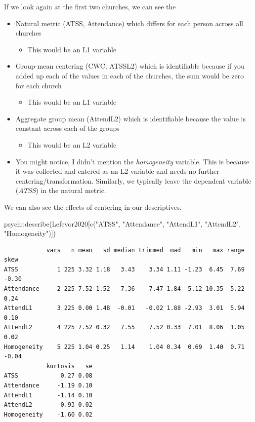 \documentclass[
  english,
]{book}
\newenvironment{Shaded}{\begin{snugshade}}{\end{snugshade}}
\newcommand{\FunctionTok}[1]{\textcolor[rgb]{0.00,0.00,0.00}{#1}}
\newcommand{\NormalTok}[1]{#1}
\newcommand{\SpecialCharTok}[1]{\textcolor[rgb]{0.00,0.00,0.00}{#1}}
\newcommand{\StringTok}[1]{\textcolor[rgb]{0.31,0.60,0.02}{#1}}
\providecommand{\tightlist}{%
  \setlength{\itemsep}{0pt}\setlength{\parskip}{0pt}}
\begin{document}
If we look again at the first two churches, we can see the

\begin{itemize}
\tightlist
\item
  Natural metric (ATSS, Attendance) which differs for each person across all churches

  \begin{itemize}
  \tightlist
  \item
    This would be an L1 variable
  \end{itemize}
\item
  Group-mean centering (CWC; ATSSL2) which is identifiable because if you added up each of the values in each of the churches, the sum would be zero for each church

  \begin{itemize}
  \tightlist
  \item
    This would be an L1 variable
  \end{itemize}
\item
  Aggregate group mean (AttendL2) which is identifiable because the value is constant across each of the groups

  \begin{itemize}
  \tightlist
  \item
    This would be an L2 variable
  \end{itemize}
\item
  You might notice, I didn't mention the \emph{homogeneity} variable. This is because it was collected and entered as an L2 variable and needs no further centering/transformation. Similarly, we typically leave the dependent variable (\emph{ATSS}) in the natural metric.
\end{itemize}

We can also see the effects of centering in our descriptives.

\begin{Shaded}
\begin{Highlighting}[]
\NormalTok{psych}\SpecialCharTok{::}\FunctionTok{describe}\NormalTok{(Lefevor2020[}\FunctionTok{c}\NormalTok{(}\StringTok{"ATSS"}\NormalTok{, }\StringTok{"Attendance"}\NormalTok{, }\StringTok{"AttendL1"}\NormalTok{, }\StringTok{"AttendL2"}\NormalTok{, }\StringTok{"Homogeneity"}\NormalTok{)])}
\end{Highlighting}
\end{Shaded}

\begin{verbatim}
            vars   n mean   sd median trimmed  mad   min   max range  skew
ATSS           1 225 3.32 1.18   3.43    3.34 1.11 -1.23  6.45  7.69 -0.30
Attendance     2 225 7.52 1.52   7.36    7.47 1.84  5.12 10.35  5.22  0.24
AttendL1       3 225 0.00 1.48  -0.01   -0.02 1.88 -2.93  3.01  5.94  0.10
AttendL2       4 225 7.52 0.32   7.55    7.52 0.33  7.01  8.06  1.05  0.02
Homogeneity    5 225 1.04 0.25   1.14    1.04 0.34  0.69  1.40  0.71 -0.04
            kurtosis   se
ATSS            0.27 0.08
Attendance     -1.19 0.10
AttendL1       -1.14 0.10
AttendL2       -0.93 0.02
Homogeneity    -1.60 0.02
\end{verbatim}
\end{document}
